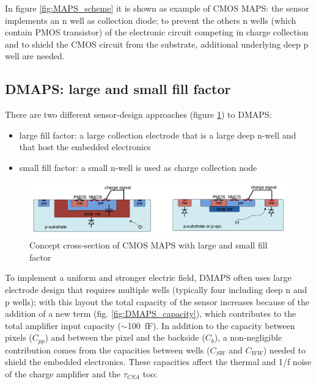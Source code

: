    In figure \ref{fig:MAPS_scheme} it is shown as example of CMOS MAPS: the sensor implements an n well as collection diode; to prevent the others n wells (which contain PMOS transistor) of the electronic circuit competing in charge collection and to shield the CMOS circuit from the substrate, additional underlying deep p well are needed.
   

   \subsection{DMAPS: large and small fill factor}\label{sec:small-large-fill-factor}
      There are two different sensor-design approaches (figure \ref{fig:large_small_sensor_scheme})
      to DMAPS:
      \begin{itemize}
         \item large fill factor: a large collection electrode that is a large deep n-well
      and that host the embedded electronics
         \item small fill factor: a small n-well is used as charge collection node
      \end{itemize}
      \begin{figure}
         \centering\includegraphics[width=15cm]{figures/Pixel_detectors/large_small_sensor_scheme.png}
         \caption{Concept cross-section of CMOS MAPS with large and small fill factor}
         \label{fig:large_small_sensor_scheme}
      \end{figure}
      To implement a uniform and stronger electric field, DMAPS often uses large electrode design that requires multiple wells (typically four including deep n and p wells); with this layout the total capacity of the sensor increases because of the addition of a new term (fig. \ref{fig:DMAPS_capacity}), which contributes to the total amplifier input capacity ($\sim$\SI{100}{fF}). In addition to the capacity between pixels ($C_{pp}$) and between the pixel and the backside ($C_{b}$), a non-negligible contribution comes from the capacities between wells ($C_{SW}$ and $C_{WW}$) needed to shield the embedded electronics. These capacities affect the thermal and 1/f noise of the charge amplifier and the $ \tau_{CSA}$ too:

